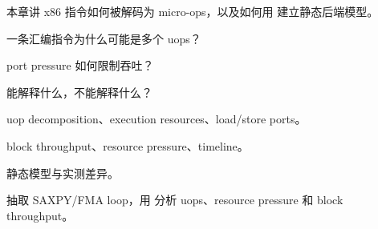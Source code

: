 {本章讲 x86 指令如何被解码为 micro-ops，以及如何用  建立静态后端模型。}
{\item 一条汇编指令为什么可能是多个 uops？
\item port pressure 如何限制吞吐？
\item {} 能解释什么，不能解释什么？}
{\item uop decomposition、execution resources、load/store ports。
\item block throughput、resource pressure、timeline。
\item 静态模型与实测差异。}
{抽取 SAXPY/FMA loop，用  分析 uops、resource pressure 和 block throughput。}
